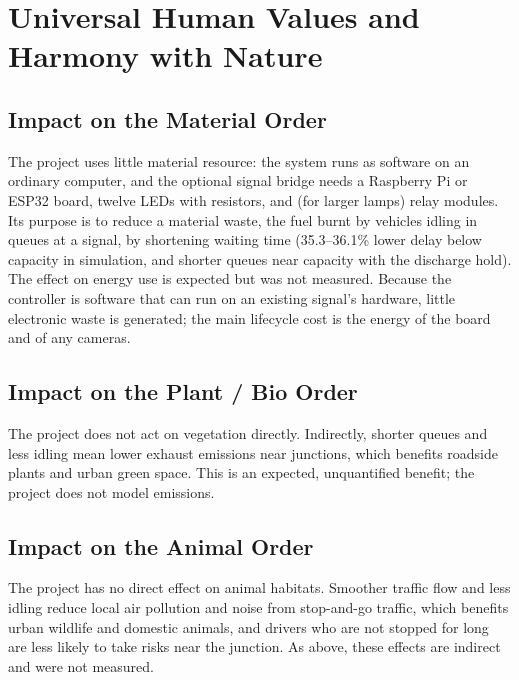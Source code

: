 \chapter{Universal Human Values and Harmony with Nature}
\label{chap:uhv}

\section{Impact on the Material Order}
The project uses little material resource: the system runs as software on an ordinary computer, and the optional signal bridge needs a Raspberry Pi or ESP32 board, twelve LEDs with resistors, and (for larger lamps) relay modules. Its purpose is to reduce a material waste, the fuel burnt by vehicles idling in queues at a signal, by shortening waiting time (35.3--36.1\% lower delay below capacity in simulation, and shorter queues near capacity with the discharge hold). The effect on energy use is expected but was not measured. Because the controller is software that can run on an existing signal's hardware, little electronic waste is generated; the main lifecycle cost is the energy of the board and of any cameras.

\section{Impact on the Plant / Bio Order}
The project does not act on vegetation directly. Indirectly, shorter queues and less idling mean lower exhaust emissions near junctions, which benefits roadside plants and urban green space. This is an expected, unquantified benefit; the project does not model emissions.

\section{Impact on the Animal Order}
The project has no direct effect on animal habitats. Smoother traffic flow and less idling reduce local air pollution and noise from stop-and-go traffic, which benefits urban wildlife and domestic animals, and drivers who are not stopped for long are less likely to take risks near the junction. As above, these effects are indirect and were not measured.

